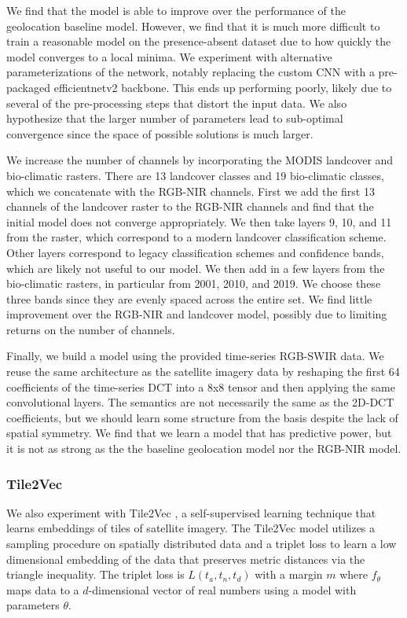 We find that the model is able to improve over the performance of the geolocation baseline model.
However, we find that it is much more difficult to train a reasonable model on the presence-absent dataset due to how quickly the model converges to a local minima.
We experiment with alternative parameterizations of the network, notably replacing the custom CNN with a pre-packaged efficientnetv2 backbone.
This ends up performing poorly, likely due to several of the pre-processing steps that distort the input data.
We also hypothesize that the larger number of parameters lead to sub-optimal convergence since the space of possible solutions is much larger.

We increase the number of channels by incorporating the MODIS landcover and bio-climatic rasters.
There are 13 landcover classes and 19 bio-climatic classes, which we concatenate with the RGB-NIR channels.
First we add the first 13 channels of the landcover raster to the RGB-NIR channels and find that the initial model does not converge appropriately.
We then take layers 9, 10, and 11 from the raster, which correspond to a modern landcover classification scheme.
Other layers correspond to legacy classification schemes and confidence bands, which are likely not useful to our model.
We then add in a few layers from the bio-climatic rasters, in particular from 2001, 2010, and 2019.
We choose these three bands since they are evenly spaced across the entire set.
We find little improvement over the RGB-NIR and landcover model, possibly due to limiting returns on the number of channels.

Finally, we build a model using the provided time-series RGB-SWIR data.
We reuse the same architecture as the satellite imagery data by reshaping the first 64 coefficients of the time-series DCT into a 8x8 tensor and then applying the same convolutional layers.
The semantics are not necessarily the same as the 2D-DCT coefficients, but we should learn some structure from the basis despite the lack of spatial symmetry.
We find that we learn a model that has predictive power, but it is not as strong as the the baseline geolocation model nor the RGB-NIR model.

\subsubsection{Tile2Vec}

We also experiment with Tile2Vec \cite{jean2019tile2vec}, a self-supervised learning technique that learns embeddings of tiles of satellite imagery.
The Tile2Vec model utilizes a sampling procedure on spatially distributed data and a triplet loss to learn a low dimensional embedding of the data that preserves metric distances via the triangle inequality.
The triplet loss is $L(t_a, t_n, t_d)$ with a margin $m$ where $f_{\theta}$ maps data to a $d$-dimensional vector of real numbers using a model with parameters $\theta$. 


